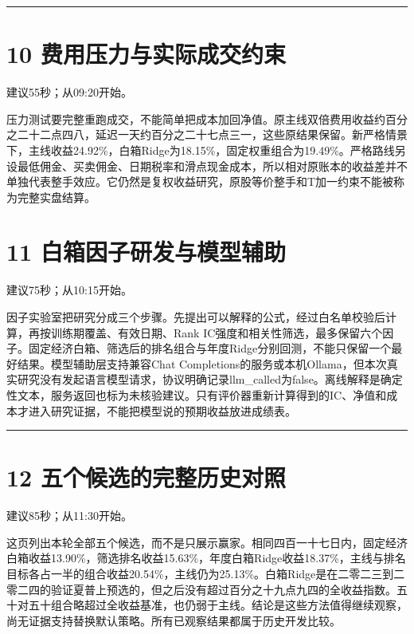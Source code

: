 \documentclass[UTF8,a4paper,12pt]{ctexart}
\begin{document}
\vspace{4mm}\noindent\textcolor{accent!40}{\rule{\textwidth}{0.4pt}}\par

\section*{\color{ink}10  费用压力与实际成交约束}

{\small\color{accent}建议55秒；从09:20开始。}\par

压力测试要完整重跑成交，不能简单把成本加回净值。原主线双倍费用收益约百分之二十二点四八，延迟一天约百分之二十七点三一，这些原结果保留。新严格情景下，主线收益24.92\%，白箱Ridge为18.15\%，固定权重组合为19.49\%。严格路线另设最低佣金、买卖佣金、日期税率和滑点现金成本，所以相对原账本的收益差并不单独代表整手效应。它仍然是复权收益研究，原股等价整手和T加一约束不能被称为完整实盘结算。


\newpage

\section*{\color{ink}11  白箱因子研发与模型辅助}

{\small\color{accent}建议75秒；从10:15开始。}\par

因子实验室把研究分成三个步骤。先提出可以解释的公式，经过白名单校验后计算，再按训练期覆盖、有效日期、Rank IC强度和相关性筛选，最多保留六个因子。固定经济白箱、筛选后的排名组合与年度Ridge分别回测，不能只保留一个最好结果。模型辅助层支持兼容Chat Completions的服务或本机Ollama，但本次真实研究没有发起语言模型请求，协议明确记录llm\_called为false。离线解释是确定性文本，服务返回也标为未核验建议。只有评价器重新计算得到的IC、净值和成本才进入研究证据，不能把模型说的预期收益放进成绩表。


\vspace{4mm}\noindent\textcolor{accent!40}{\rule{\textwidth}{0.4pt}}\par

\section*{\color{ink}12  五个候选的完整历史对照}

{\small\color{accent}建议85秒；从11:30开始。}\par

这页列出本轮全部五个候选，而不是只展示赢家。相同四百一十七日内，固定经济白箱收益13.90\%，筛选排名收益15.63\%，年度白箱Ridge收益18.37\%，主线与排名目标各占一半的组合收益20.54\%，主线仍为25.13\%。白箱Ridge是在二零二三到二零二四的验证夏普上预选的，但之后没有超过百分之十九点九四的全收益指数。五十对五十组合略超过全收益基准，也仍弱于主线。结论是这些方法值得继续观察，尚无证据支持替换默认策略。所有已观察结果都属于历史开发比较。
\end{document}
